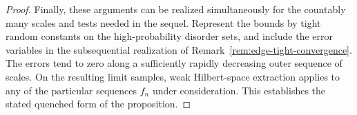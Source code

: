 \begin{proof}
Finally, these arguments can be realized simultaneously for the
countably many scales and tests needed in the sequel. Represent the
bounds by tight random constants on the high-probability disorder
sets, and include the error variables in the subsequential realization
of Remark~\ref{rem:edge-tight-convergence}. The errors tend to zero
along a sufficiently rapidly decreasing outer sequence of scales.
On the resulting limit samples, weak Hilbert-space extraction applies
to any of the particular sequences $f_n$ under consideration. This
establishes the stated quenched form of the proposition.
\end{proof}
